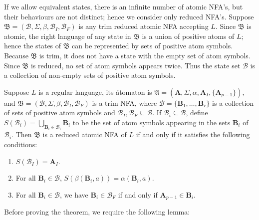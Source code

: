 \documentclass{llncs}
\newcommand{\Sig}{\Sigma}
\newcommand{\be}{\begin{enumerate}}
\newcommand{\ee}{\end{enumerate}}
\newcommand{\bA}{{\mathbf A}}
\newcommand{\bmA}{\bm{A}}
\newcommand{\bmB}{\bm{B}}
\newcommand{\cB}{{\mathcal B}}
\newcommand{\fA}{{\mathfrak A}}
\newcommand{\fB}{{\mathfrak B}}
\begin{document}
If we allow equivalent states, there is an infinite number of atomic NFA's, 
but their behaviours are not distinct; hence we consider only reduced NFA's.
Suppose $\fB=(\cB,\Sig,\beta,\cB_I,\cB_F)$ is any trim reduced atomic NFA accepting $L$.
Since $\fB$ is atomic, the right language of any state in $\fB$ is a union of positive atoms
of $L$; hence the states of $\fB$ can be represented by sets of positive atom symbols.
Because $\fB$ is trim, it does not have a state with the empty set of atom symbols.
Since $\fB$ is reduced, no set of atom symbols appears twice.
Thus the state set $\cB$ is a collection of non-empty sets of positive atom symbols.


\begin{theorem}[Legality]
\label{thm:unions}
Suppose $L$ is a regular language,  its \'atomaton is
$\fA=(\bmA,\Sig,\alpha,\bmA_I, \{\bA_{p-1}\})$, and
$\fB=(\cB,\Sig,\beta,\cB_I,\cB_F)$ is a trim NFA, where 
$\cB=\{\bmB_1,\ldots,\bmB_r\}$ is a collection of sets of positive atom symbols and 
$\cB_I,\cB_F\subseteq\cB$.
If $\cB_i\subseteq  \cB$, define 
$S(\cB_i)=\bigcup_{\bmB_i\in \cB_i} \bmB_i$ to be the set of atom symbols 
appearing in the sets $\bmB_i$  of $\cB_i$. 
Then $\fB$ is a reduced atomic NFA of $L$ if and only if it satisfies the following
conditions:
\be
\item
\label{cond:in}
$S(\cB_I)=\bmA_I$.
\item
\label{cond:trans}
For all $\bmB_i\in \cB$, $S(\beta(\bmB_i,a))=\alpha(\bmB_i,a)$.
\item
\label{cond:out}
For all $\bmB_i\in \cB$, we have $\bmB_i\in \cB_F$ if and only if 
$\bA_{p-1}\in \bmB_i$.
\ee
\end{theorem}

Before proving the theorem, we require the following lemma:
\end{document}
